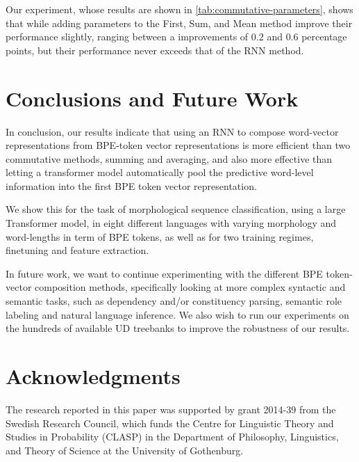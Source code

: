 \documentclass[11pt]{article}
\begin{document}
                    Our experiment, whose results are shown in
     \cref{tab:commutative-parameters}, shows that while adding
     parameters to the First, Sum, and Mean method improve their
     performance slightly, ranging between a improvements of $0.2$ and
     $0.6$ percentage points, but their performance never exceeds that
     of the RNN method.

    

    \section{Conclusions and Future Work}


        In conclusion, our results indicate that using an RNN to
     compose word-vector representations from BPE-token vector
     representations is more efficient than two commutative methods,
     summing and averaging, and also more effective than letting a
     transformer model automatically pool the predictive word-level
     information into the first BPE token vector representation.

            We show this for the task of morphological sequence
     classification, using a large Transformer model, in eight
     different languages with varying morphology and word-lengths in
     term of BPE tokens, as well as for two training regimes,
     finetuning and feature extraction.
     
        In future work, we want to continue experimenting with the
     different BPE token-vector composition methods, specifically
     looking at more complex syntactic and semantic tasks, such as
     dependency and/or constituency parsing, semantic role labeling
     and natural language inference.
            We also wish to run our experiments on the hundreds of
     available UD treebanks to improve the robustness of our results.
    
	\section*{Acknowledgments}
            The research reported in this paper was supported by grant
     2014-39 from the Swedish Research Council, which funds the Centre
     for Linguistic Theory and Studies in Probability (CLASP) in the
     Department of Philosophy, Linguistics, and Theory of Science at
     the University of Gothenburg.

	
	
	
\end{document}
